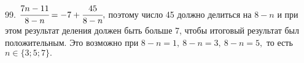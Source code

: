 99. $\cfrac{7n-11}{8-n}=-7+\cfrac{45}{8-n},$ поэтому число 45 должно делиться на $8-n$ и при этом результат деления должен быть больше 7, чтобы итоговый результат был положительным. Это возможно при $8-n=1,\ 8-n=3,\ 8-n=5,$ то есть $n\in\{3;5;7\}.$\\
